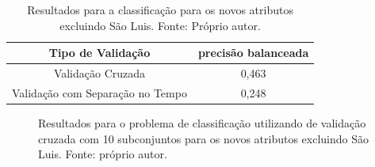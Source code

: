 \begin{table}[h]
\begin{center}
\begin{tabular}{|c|c|}
\hline
Tipo de Validação & precisão balanceada   \\ \hline
Validação Cruzada                   & 0,463    \\ \hline
Validação com Separação no Tempo    & 0,248     \\ \hline
\end{tabular}
\end{center}
\vspace{12pt}
\caption{Resultados para a classificação  para os novos atributos excluindo São Luis. Fonte: Próprio autor.}
\label{tab:results_v1_w_class}
\end{table}

\begin{figure}[H]
\center
\hspace{-2cm}
\caption{Resultados para o problema de classificação utilizando de validação cruzada com 10 subconjuntos para os novos atributos excluindo São Luis. Fonte: próprio autor.}
\label{fig:classv1wmik}
\end{figure}

